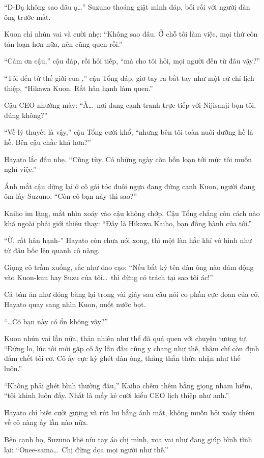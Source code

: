 \documentclass[../main.tex]{subfiles}
\begin{document}
``D-Dạ không sao đâu ạ\dots'' Suzuno thoáng giật mình đáp, bối rối với người đàn ông trước mắt.

Kuon chỉ nhún vai và cười nhẹ: ``Không sao đâu. Ở chỗ tôi làm việc, mọi thứ còn tán loạn hơn nữa, nên cũng quen rồi.''

``Cảm ơn cậu,'' cậu đáp, rồi hỏi tiếp, ``mà cho tôi hỏi, mọi người đến từ đâu vậy?''

``Tôi đến từ thế giới của \hll,'' cậu Tổng đáp, giơ tay ra bắt tay như một cử chỉ lịch thiệp, ``Hikawa Kuon. Rất hân hạnh làm quen.''

Cậu CEO nhướng mày: ``À\dots\ nơi đang cạnh tranh trực tiếp với Nijisanji bọn tôi, đúng không?''

``Về lý thuyết là vậy,'' cậu Tổng cười khổ, ``nhưng bên tôi toàn nuôi dưỡng hề là hề. Bên cậu chắc khá hơn?''

Hayato lắc đầu nhẹ. ``Cũng tùy. Có những ngày còn hỗn loạn tới mức tôi muốn nghỉ việc.''

Ánh mắt cậu dừng lại ở cô gái tóc đuôi ngựa đang đứng cạnh Kuon, người đang ôm lấy Suzuno. ``Còn cô bạn này thì sao?''

Kaiho im lặng, mắt nhìn xoáy vào cậu không chớp. Cậu Tổng chẳng còn cách nào khá ngoài phải giới thiệu thay: ``Đây là Hikawa Kaiho, bạn đồng hành của tôi.''

``Ừ, rất hân hạnh-'' Hayato còn chưa nói xong, thì một làn hắc khí vô hình như từ đâu bốc lên quanh cô nàng.

Giọng cô trầm xuống, sắc như dao cạo: ``Nếu bất kỳ tên đàn ông nào dám động vào Kuon-kun hay Suzu của tôi\dots\ thì đừng có trách tại sao tôi ác!''

Cả bàn ăn như đóng băng lại trong vài giây sau câu nói co phần cực đoan của cô. Hayato quay sang nhìn Kuon, nuốt nước bọt.

``\dots Cô bạn này có ổn không vậy?''

Kuon nhún vai lần nữa, thản nhiên như thể đã quá quen với chuyện tương tự. ``Đừng lo, lúc tôi mới gặp cô ấy lần đầu cũng y chang như thế, thậm chí còn định đấm chết tôi cơ. Cô ấy cực kỳ ghét đàn ông, thẳng thắn thừa nhận như thế luôn.''

``Không phải ghét bình thường đâu,'' Kaiho chêm thêm bằng giọng nham hiểm, ``tôi khinh luôn đấy. Nhất là mấy kẻ cười kiểu CEO lịch thiệp như anh.''

Hayato chỉ biết cười gượng và rút lui bằng ánh mắt, không muốn hỏi xoáy thêm về cô nàng ấy lần nào nữa.

Bên cạnh họ, Suzuno khẽ níu tay áo chị mình, xoa vai như đang giúp bình tĩnh lại: ``Onee-sama\dots\ Chị đừng dọa mọi người như thế.''
\end{document}
